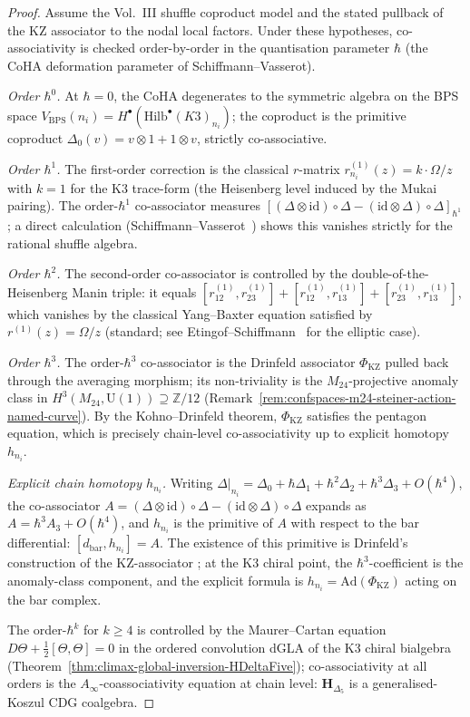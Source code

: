 \begin{proof}
Assume the Vol.~III shuffle coproduct model and the stated pullback of
the KZ associator to the nodal local factors. Under these hypotheses,
co-associativity is checked order-by-order in the quantisation parameter
$\hbar$ (the CoHA deformation parameter of Schiffmann--Vasserot).

\emph{Order $\hbar^0$.} At $\hbar=0$, the CoHA degenerates to the
symmetric algebra on the BPS space
$V_{\mathrm{BPS}}(n_i) = H^\bullet(\mathrm{Hilb}^\bullet(K3)_{n_i})$;
the coproduct is the primitive coproduct
$\Delta_0(v) = v\otimes 1 + 1\otimes v$, strictly co-associative.

\emph{Order $\hbar^1$.} The first-order correction is the classical
$r$-matrix
$r^{(1)}_{n_i}(z) = k\cdot\Omega/z$ with $k = 1$ for the K3 trace-form
(the Heisenberg level induced by the Mukai pairing). The order-$\hbar^1$
co-associator measures
$[(\Delta\otimes\mathrm{id})\circ\Delta - (\mathrm{id}\otimes\Delta)\circ\Delta]_{\hbar^1}$;
a direct calculation (Schiffmann--Vasserot~\cite[Section~4.3]{SV13})
shows this vanishes strictly for the rational shuffle algebra.

\emph{Order $\hbar^2$.} The second-order co-associator is controlled by
the double-of-the-Heisenberg Manin triple: it equals
$[r^{(1)}_{12},r^{(1)}_{23}] + [r^{(1)}_{12},r^{(1)}_{13}]
+ [r^{(1)}_{23},r^{(1)}_{13}]$, which vanishes by the classical Yang--Baxter
equation satisfied by $r^{(1)}(z) = \Omega/z$ (standard; see
Etingof--Schiffmann~\cite{EtingofSchiffmann98} for the elliptic case).

\emph{Order $\hbar^3$.} The order-$\hbar^3$ co-associator is the
Drinfeld associator $\Phi_{\mathrm{KZ}}$ pulled back through the
averaging morphism; its non-triviality is the $M_{24}$-projective
anomaly class in
$H^3(M_{24},\mathrm{U}(1))\supseteq\mathbb{Z}/12$
(Remark~\ref{rem:confspaces-m24-steiner-action-named-curve}). By the
Kohno--Drinfeld theorem, $\Phi_{\mathrm{KZ}}$ satisfies the pentagon
equation, which is precisely chain-level co-associativity up to
explicit homotopy $h_{n_i}$.

\emph{Explicit chain homotopy $h_{n_i}$.} Writing
$\Delta|_{n_i} = \Delta_0 + \hbar\Delta_1 + \hbar^2\Delta_2
+ \hbar^3\Delta_3 + O(\hbar^4)$, the co-associator
$A = (\Delta\otimes\mathrm{id})\circ\Delta - (\mathrm{id}\otimes\Delta)
\circ\Delta$ expands as $A = \hbar^3 A_3 + O(\hbar^4)$, and
$h_{n_i}$ is the primitive of $A$ with respect to the bar
differential: $[d_{\mathrm{bar}}, h_{n_i}] = A$. The existence of this
primitive is Drinfeld's construction of the $\mathrm{KZ}$-associator
\cite{Drinfeld1990}; at the K3 chiral point, the $\hbar^3$-coefficient
is the anomaly-class component, and the explicit formula is
$h_{n_i} = \mathrm{Ad}(\Phi_{\mathrm{KZ}})$ acting on the bar complex.

The order-$\hbar^k$ for $k\geq 4$ is controlled by the Maurer--Cartan
equation $D\Theta + \tfrac{1}{2}[\Theta,\Theta] = 0$ in the ordered
convolution dGLA of the K3 chiral bialgebra
(Theorem~\ref{thm:climax-global-inversion-HDeltaFive}); co-associativity
at all orders is the $A_\infty$-coassociativity equation at chain
level: $\mathbf{H}_{\Delta_5}$ is a generalised-Koszul CDG coalgebra.
\end{proof}

